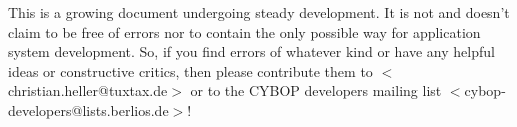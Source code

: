 This is a growing document undergoing steady development. It is not and doesn't
claim to be free of errors nor to contain the only possible way for application
system development. So, if you find errors of whatever kind or have any helpful
ideas or constructive critics, then please contribute them to
\(<\)christian.heller@tuxtax.de\(>\) or to the CYBOP developers mailing list
\(<\)cybop-developers@lists.berlios.de\(>\)!
